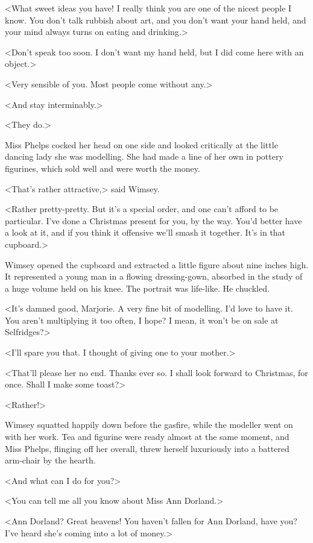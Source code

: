 <What sweet ideas you have! I really think you are one of the nicest people I know. You don't talk rubbish about art, and you don't want your hand held, and your mind always turns on eating and drinking.>

<Don't speak too soon. I don't want my hand held, but I did come here with an object.>

<Very sensible of you. Most people come without any.>

<And stay interminably.>

<They do.>

Miss Phelps cocked her head on one side and looked critically at the little dancing lady she was modelling. She had made a line of her own in pottery figurines, which sold well and were worth the money.

<That's rather attractive,> said Wimsey.

<Rather pretty-pretty. But it's a special order, and one can't afford to be particular. I've done a Christmas present for you, by the way. You'd better have a look at it, and if you think it offensive we'll smash it together. It's in that cupboard.>

Wimsey opened the cupboard and extracted a little figure about nine inches high. It represented a young man in a flowing dressing-gown, absorbed in the study of a huge volume held on his knee. The portrait was life-like. He chuckled.

<It's damned good, Marjorie. A very fine bit of modelling. I'd love to have it. You aren't multiplying it too often, I hope? I mean, it won't be on sale at Selfridges?>

<I'll spare you that. I thought of giving one to your mother.>

<That'll please her no end. Thanks ever so. I shall look forward to Christmas, for once. Shall I make some toast?>

<Rather!>

Wimsey squatted happily down before the gasfire, while the modeller went on with her work. Tea and figurine were ready almost at the same moment, and Miss Phelps, flinging off her overall, threw herself luxuriously into a battered arm-chair by the hearth.

<And what can I do for you?>

<You can tell me all you know about Miss Ann Dorland.>

<Ann Dorland? Great heavens! You haven't fallen for Ann Dorland, have you? I've heard she's coming into a lot of money.>

